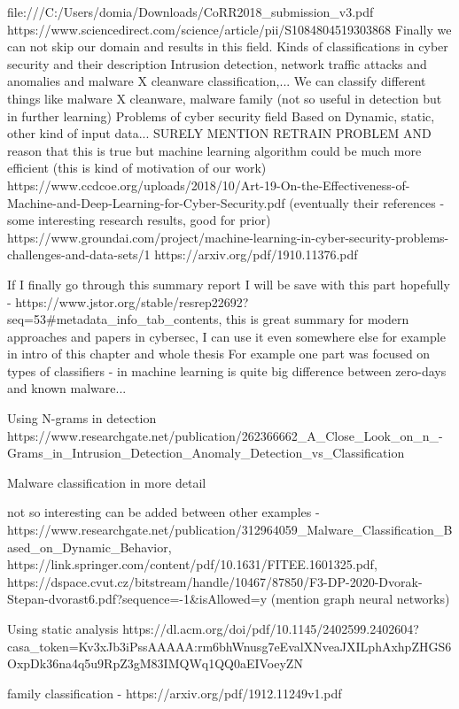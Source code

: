 file:///C:/Users/domia/Downloads/CoRR2018_submission_v3.pdf
https://www.sciencedirect.com/science/article/pii/S1084804519303868
Finally we can not skip our domain and results in this field. 
Kinds of classifications in cyber security and their description
Intrusion detection, network traffic attacks and anomalies and malware X cleanware classification,...
We can classify different things like malware X cleanware, malware family (not so useful in detection but in further learning)
Problems of cyber security field
Based on Dynamic, static, other kind of input data...
SURELY MENTION RETRAIN PROBLEM AND reason that this is true but machine learning algorithm could be much more efficient (this is kind of motivation of our work)
https://www.ccdcoe.org/uploads/2018/10/Art-19-On-the-Effectiveness-of-Machine-and-Deep-Learning-for-Cyber-Security.pdf (eventually their references - some interesting research results, good for prior)
https://www.groundai.com/project/machine-learning-in-cyber-security-problems-challenges-and-data-sets/1
https://arxiv.org/pdf/1910.11376.pdf

If I finally go through this summary report I will be save with this part hopefully - https://www.jstor.org/stable/resrep22692?seq=53#metadata_info_tab_contents, this is great summary for modern approaches and papers in cybersec, I can use it even somewhere else for example in intro of this chapter and whole thesis
For example one part was focused on types of classifiers - in machine learning is quite big difference between zero-days and known malware...

Using N-grams in detection https://www.researchgate.net/publication/262366662_A_Close_Look_on_n_-Grams_in_Intrusion_Detection_Anomaly_Detection_vs_Classification

Malware classification in more detail

not so interesting can be added between other examples - https://www.researchgate.net/publication/312964059_Malware_Classification_Based_on_Dynamic_Behavior, https://link.springer.com/content/pdf/10.1631/FITEE.1601325.pdf, https://dspace.cvut.cz/bitstream/handle/10467/87850/F3-DP-2020-Dvorak-Stepan-dvorast6.pdf?sequence=-1&isAllowed=y (mention graph neural networks)

Using static analysis https://dl.acm.org/doi/pdf/10.1145/2402599.2402604?casa_token=Kv3xJb3iPssAAAAA:rm6bhWnusg7eEvalXNveaJXILphAxhpZHGS6OxpDk36na4q5u9RpZ3gM83IMQWq1QQ0aEIVoeyZN

family classification - https://arxiv.org/pdf/1912.11249v1.pdf

